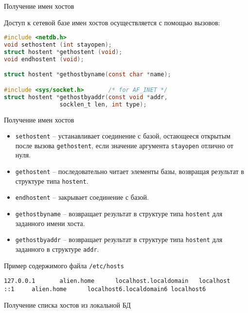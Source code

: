 \begin{frame}[fragile]{Получение имен хостов}

Доступ к сетевой базе имен хостов осуществляется с помощью вызовов:
\begin{lstlisting}[language=C]
#include <netdb.h>
void sethostent (int stayopen);
struct hostent *gethostent (void);
void endhostent (void);

struct hostent *gethostbyname(const char *name);

#include <sys/socket.h>       /* for AF_INET */
struct hostent *gethostbyaddr(const void *addr,
				socklen_t len, int type);
\end{lstlisting}
\end{frame}

\begin{frame}[fragile]{Получение имен хостов}

\begin{itemize}
	\item {\tt sethostent} -- устанавливает соединение с базой, остающееся открытым после вызова {\tt gethostent}, если значение аргумента {\tt stayopen} отлично от нуля.
	\item {\tt gethostent} -- последовательно читает элементы базы, возвращая результат в структуре типа {\tt hostent}.
	\item {\tt endhostent} -- закрывает соединение с базой.
	\item {\tt gethostbyname} -- возвращает результат в структуре типа {\tt hostent} для заданного имени хоста.
	\item {\tt gethostbyaddr} -- возвращает результат в структуре типа {\tt hostent} для заданного в структуре {\tt addr}.	
\end{itemize}
\end{frame}

\begin{frame}[fragile]{Пример содержимого файла {\tt /etc/hosts}}
\scriptsize
\begin{verbatim}
127.0.0.1       alien.home      localhost.localdomain   localhost
::1     alien.home      localhost6.localdomain6 localhost6
\end{verbatim}
\normalsize
\end{frame}

\begin{frame}[fragile]{Получение списка хостов из локальной БД}
\tiny
\end{frame}

